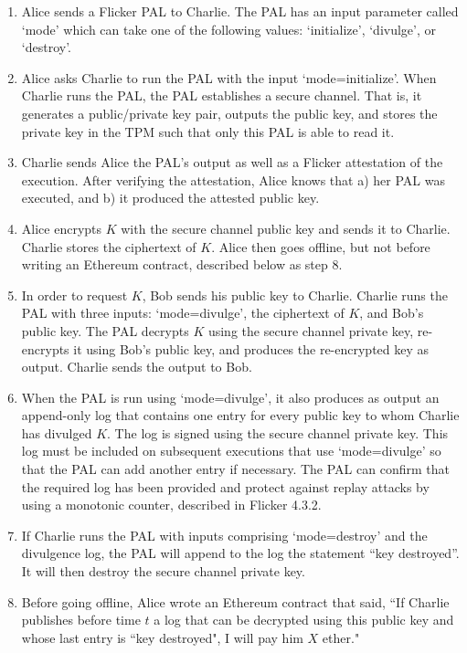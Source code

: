 \documentclass{article}
\begin{document}
\begin{enumerate}

\item Alice sends a Flicker PAL to Charlie. The PAL has an input parameter called `mode' which can take one of the following values: `initialize', `divulge', or `destroy'. 

\item Alice asks Charlie to run the PAL with the input `mode=initialize'. When Charlie runs the PAL, the PAL establishes a secure channel. That is, it generates a public/private key pair, outputs the public key, and stores the private key in the TPM such that only this PAL is able to read it.

\item Charlie sends Alice the PAL's output as well as a Flicker attestation of the execution. After verifying the attestation, Alice knows that a) her PAL was executed, and b) it produced the attested public key.

\item Alice encrypts $K$ with the secure channel public key and sends it to Charlie. Charlie stores the ciphertext of $K$. Alice then goes offline, but not before writing an Ethereum contract, described below as step 8.

\item In order to request $K$, Bob sends his public key to Charlie. Charlie runs the PAL with three inputs: `mode=divulge', the ciphertext of $K$, and Bob's public key. The PAL decrypts $K$ using the secure channel private key, re-encrypts it using Bob's public key, and produces the re-encrypted key as output. Charlie sends the output to Bob.

\item When the PAL is run using `mode=divulge', it also produces as output an append-only log that contains one entry for every public key to whom Charlie has divulged $K$. The log is signed using the secure channel private key. This log must be included on subsequent executions that use `mode=divulge' so that the PAL can add another entry if necessary. The PAL can confirm that the required log has been provided and protect against replay attacks by using a monotonic counter, described in Flicker 4.3.2.

\item If Charlie runs the PAL with inputs comprising `mode=destroy' and the divulgence log, the PAL will append to the log the statement ``key destroyed''. It will then destroy the secure channel private key.

\item Before going offline, Alice wrote an Ethereum contract that said, ``If Charlie publishes before time $t$ a log that can be decrypted using this public key and whose last entry is ``key destroyed", I will pay him $X$ ether."

\end{enumerate}
\end{document}
